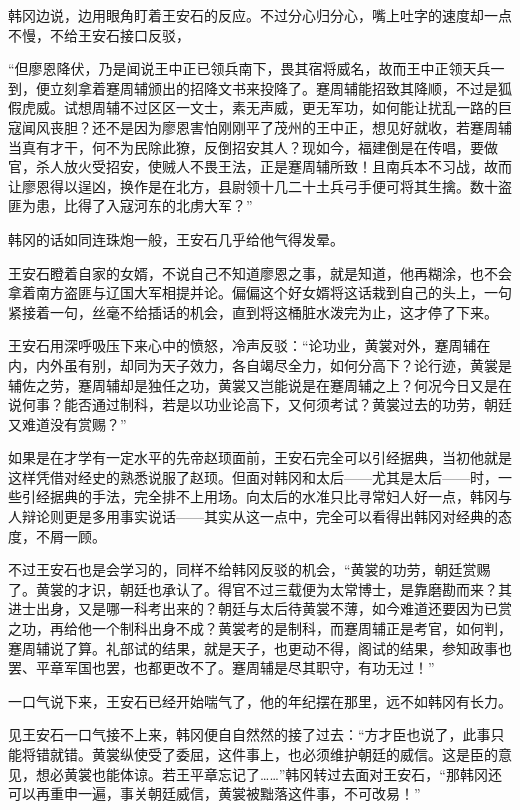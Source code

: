韩冈边说，边用眼角盯着王安石的反应。不过分心归分心，嘴上吐字的速度却一点不慢，不给王安石接口反驳，

“但廖恩降伏，乃是闻说王中正已领兵南下，畏其宿将威名，故而王中正领天兵一到，便立刻拿着蹇周辅颁出的招降文书来投降了。蹇周辅能招致其降顺，不过是狐假虎威。试想周辅不过区区一文士，素无声威，更无军功，如何能让扰乱一路的巨寇闻风丧胆？还不是因为廖恩害怕刚刚平了茂州的王中正，想见好就收，若蹇周辅当真有才干，何不为民除此獠，反倒招安其人？现如今，福建倒是在传唱，要做官，杀人放火受招安，使贼人不畏王法，正是蹇周辅所致！且南兵本不习战，故而让廖恩得以逞凶，换作是在北方，县尉领十几二十土兵弓手便可将其生擒。数十盗匪为患，比得了入寇河东的北虏大军？”

韩冈的话如同连珠炮一般，王安石几乎给他气得发晕。

王安石瞪着自家的女婿，不说自己不知道廖恩之事，就是知道，他再糊涂，也不会拿着南方盗匪与辽国大军相提并论。偏偏这个好女婿将这话栽到自己的头上，一句紧接着一句，丝毫不给插话的机会，直到将这桶脏水泼完为止，这才停了下来。

王安石用深呼吸压下来心中的愤怒，冷声反驳：“论功业，黄裳对外，蹇周辅在内，内外虽有别，却同为天子效力，各自竭尽全力，如何分高下？论行迹，黄裳是辅佐之劳，蹇周辅却是独任之功，黄裳又岂能说是在蹇周辅之上？何况今日又是在说何事？能否通过制科，若是以功业论高下，又何须考试？黄裳过去的功劳，朝廷又难道没有赏赐？”

如果是在才学有一定水平的先帝赵顼面前，王安石完全可以引经据典，当初他就是这样凭借对经史的熟悉说服了赵顼。但面对韩冈和太后——尤其是太后——时，一些引经据典的手法，完全排不上用场。向太后的水准只比寻常妇人好一点，韩冈与人辩论则更是多用事实说话——其实从这一点中，完全可以看得出韩冈对经典的态度，不屑一顾。

不过王安石也是会学习的，同样不给韩冈反驳的机会，“黄裳的功劳，朝廷赏赐了。黄裳的才识，朝廷也承认了。得官不过三载便为太常博士，是靠磨勘而来？其进士出身，又是哪一科考出来的？朝廷与太后待黄裳不薄，如今难道还要因为已赏之功，再给他一个制科出身不成？黄裳考的是制科，而蹇周辅正是考官，如何判，蹇周辅说了算。礼部试的结果，就是天子，也更动不得，阁试的结果，参知政事也罢、平章军国也罢，也都更改不了。蹇周辅是尽其职守，有功无过！”

一口气说下来，王安石已经开始喘气了，他的年纪摆在那里，远不如韩冈有长力。

见王安石一口气接不上来，韩冈便自自然然的接了过去：“方才臣也说了，此事只能将错就错。黄裳纵使受了委屈，这件事上，也必须维护朝廷的威信。这是臣的意见，想必黄裳也能体谅。若王平章忘记了……”韩冈转过去面对王安石，“那韩冈还可以再重申一遍，事关朝廷威信，黄裳被黜落这件事，不可改易！”

